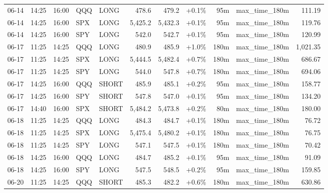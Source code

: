 \documentclass[11pt,a4paper,twoside]{article}
\begin{document}
\begin{center}
\begin{longtable}{>{\color{txtmain}}l l l l l r r r r >{\color{txtmain}}l r}
06-14 & 14:25 & 16:00 & QQQ & LONG & 478.6 & 479.2 & \textcolor{wingreen}{+0.1\%} & 95m & max\_time\_180m & \textcolor{wingreen}{111.19} \\
06-14 & 14:25 & 16:00 & SPX & LONG & 5,425.2 & 5,432.3 & \textcolor{wingreen}{+0.1\%} & 95m & max\_time\_180m & \textcolor{wingreen}{119.76} \\
06-14 & 14:25 & 16:00 & SPY & LONG & 542.0 & 542.7 & \textcolor{wingreen}{+0.1\%} & 95m & max\_time\_180m & \textcolor{wingreen}{120.99} \\
06-17 & 11:25 & 14:25 & QQQ & LONG & 480.9 & 485.9 & \textcolor{wingreen}{+1.0\%} & 180m & max\_time\_180m & \textcolor{wingreen}{1,021.35} \\
06-17 & 11:25 & 14:25 & SPX & LONG & 5,444.5 & 5,482.4 & \textcolor{wingreen}{+0.7\%} & 180m & max\_time\_180m & \textcolor{wingreen}{686.67} \\
06-17 & 11:25 & 14:25 & SPY & LONG & 544.0 & 547.8 & \textcolor{wingreen}{+0.7\%} & 180m & max\_time\_180m & \textcolor{wingreen}{694.06} \\
06-17 & 14:25 & 16:00 & QQQ & SHORT & 485.9 & 485.1 & \textcolor{wingreen}{+0.2\%} & 95m & max\_time\_180m & \textcolor{wingreen}{158.77} \\
06-17 & 14:25 & 16:00 & SPY & SHORT & 547.8 & 547.0 & \textcolor{wingreen}{+0.1\%} & 95m & max\_time\_180m & \textcolor{wingreen}{134.20} \\
06-17 & 14:40 & 16:00 & SPX & SHORT & 5,484.2 & 5,473.8 & \textcolor{wingreen}{+0.2\%} & 80m & max\_time\_180m & \textcolor{wingreen}{180.00} \\
06-18 & 11:25 & 14:25 & QQQ & LONG & 484.3 & 484.7 & \textcolor{wingreen}{+0.1\%} & 180m & max\_time\_180m & \textcolor{wingreen}{76.72} \\
06-18 & 11:25 & 14:25 & SPX & LONG & 5,475.4 & 5,480.2 & \textcolor{wingreen}{+0.1\%} & 180m & max\_time\_180m & \textcolor{wingreen}{76.75} \\
06-18 & 11:25 & 14:25 & SPY & LONG & 547.1 & 547.5 & \textcolor{wingreen}{+0.1\%} & 180m & max\_time\_180m & \textcolor{wingreen}{70.42} \\
06-18 & 14:25 & 16:00 & QQQ & LONG & 484.7 & 485.2 & \textcolor{wingreen}{+0.1\%} & 95m & max\_time\_180m & \textcolor{wingreen}{91.09} \\
06-18 & 14:25 & 16:00 & SPY & LONG & 547.5 & 548.5 & \textcolor{wingreen}{+0.2\%} & 95m & max\_time\_180m & \textcolor{wingreen}{159.85} \\
06-20 & 11:25 & 14:25 & QQQ & SHORT & 485.3 & 482.2 & \textcolor{wingreen}{+0.6\%} & 180m & max\_time\_180m & \textcolor{wingreen}{630.86} \\

\end{longtable}
\end{center}
\end{document}
